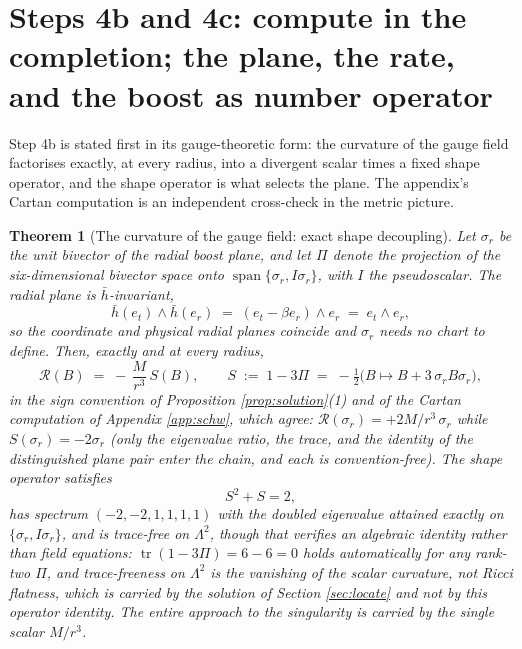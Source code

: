 \documentclass[11pt]{article}
\newtheorem{theorem}{Theorem}[section]
\theoremstyle{definition}
\newcommand{\hb}{\bar{h}}
\newcommand{\er}{e_r}
\newcommand{\et}{e_t}
\newcommand{\tr}{\operatorname{tr}}
\begin{document}
\section{Steps 4b and 4c: compute in the completion; the plane, the rate, and the boost as number operator}\label{sec:boost}

Step 4b is stated first in its gauge-theoretic form: the curvature of the gauge field factorises exactly, at every radius, into a divergent scalar times a fixed shape operator, and the shape operator is what selects the plane. The appendix's Cartan computation is an independent cross-check in the metric picture.

\begin{theorem}[The curvature of the gauge field: exact shape decoupling]\label{thm:shape}
Let $\sigma_r$ be the unit bivector of the radial boost plane, and let $\Pi$ denote the projection of the six-dimensional bivector space onto $\operatorname{span}\{\sigma_r, I\sigma_r\}$, with $I$ the pseudoscalar. The radial plane is $\hb$-invariant,
\[
\hb(\et) \wedge \hb(\er) \;=\; (\et - \beta\er) \wedge \er \;=\; \et \wedge \er ,
\]
so the coordinate and physical radial planes coincide and $\sigma_r$ needs no chart to define. Then, exactly and at every radius,
\[
\mathcal{R}(B) \;=\; -\,\frac{M}{r^3}\,S(B), \qquad
S \;:=\; 1 - 3\Pi \;=\; -\tfrac12\bigl(B \mapsto B + 3\,\sigma_r B \sigma_r\bigr),
\]
in the sign convention of Proposition \ref{prop:solution}(1) and of the Cartan computation of Appendix \ref{app:schw}, which agree: $\mathcal{R}(\sigma_r) = +2M/r^{3}\,\sigma_r$ while $S(\sigma_r) = -2\sigma_r$ (only the eigenvalue ratio, the trace, and the identity of the distinguished plane pair enter the chain, and each is convention-free). The shape operator satisfies
\[
S^2 + S = 2 ,
\]
has spectrum $(-2, -2, 1, 1, 1, 1)$ with the doubled eigenvalue attained exactly on $\{\sigma_r, I\sigma_r\}$, and is trace-free on $\Lambda^2$, though that verifies an algebraic identity rather than field equations: $\tr(1 - 3\Pi) = 6 - 6 = 0$ holds automatically for any rank-two $\Pi$, and trace-freeness on $\Lambda^2$ is the vanishing of the scalar curvature, not Ricci flatness, which is carried by the solution of Section \ref{sec:locate} and not by this operator identity. The entire approach to the singularity is carried by the single scalar $M/r^3$.
\end{theorem}
\end{document}
